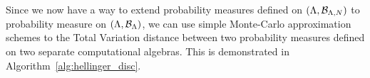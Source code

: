 Since we now have a way to extend probability measures defined on $({\Lambda}, \mathcal{B}_{{\Lambda}, N})$ to  probability measure on $({\Lambda}, \mathcal{B}_{{\Lambda}})$, we can use simple Monte-Carlo approximation schemes to the Total Variation distance between two probability measures defined on two separate computational algebras.
This is demonstrated in Algorithm~\ref{alg:hellinger_disc}.






